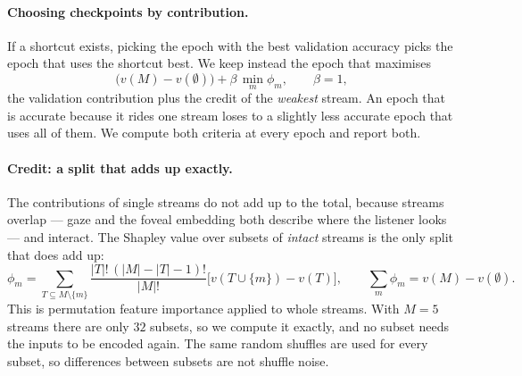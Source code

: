 \paragraph{Choosing checkpoints by contribution.}
\label{sec:selection}
If a shortcut exists, picking the epoch with the best validation accuracy picks
the epoch that uses the shortcut best. We keep instead the epoch that maximises
\begin{equation}
  \big(v(M)-v(\emptyset)\big) + \beta\,\min_m \phi_m,\qquad \beta=1,
  \label{eq:criterion}
\end{equation}
the validation contribution plus the credit of the \emph{weakest} stream. An epoch that is accurate because it rides one stream loses
to a slightly less accurate epoch that uses all of them. We compute both criteria
at every epoch and report both.

\paragraph{Credit: a split that adds up exactly.}
\label{sec:shapley}
The contributions of single streams do not add up to the total, because streams
overlap --- gaze and the foveal embedding both describe where the listener
looks --- and interact. The Shapley value \citep{shapley1953} over subsets of
\emph{intact} streams is the only split that does add up:
\begin{equation}
  \phi_m=\!\!\sum_{T\subseteq M\setminus\{m\}}\!\!
  \frac{|T|!\,(|M|-|T|-1)!}{|M|!}\Big[v(T\cup\{m\})-v(T)\Big],
  \qquad \sum_{m}\phi_m=v(M)-v(\emptyset).
  \label{eq:shapley}
\end{equation}
This is permutation feature importance \citep{breiman2001,fisher2019,covert2020}
applied to whole streams. With $M\!=\!5$ streams there are only $32$ subsets, so
we compute it exactly, and no subset needs the inputs to be encoded again. The
same random shuffles are used for every subset, so differences between subsets
are not shuffle noise.

